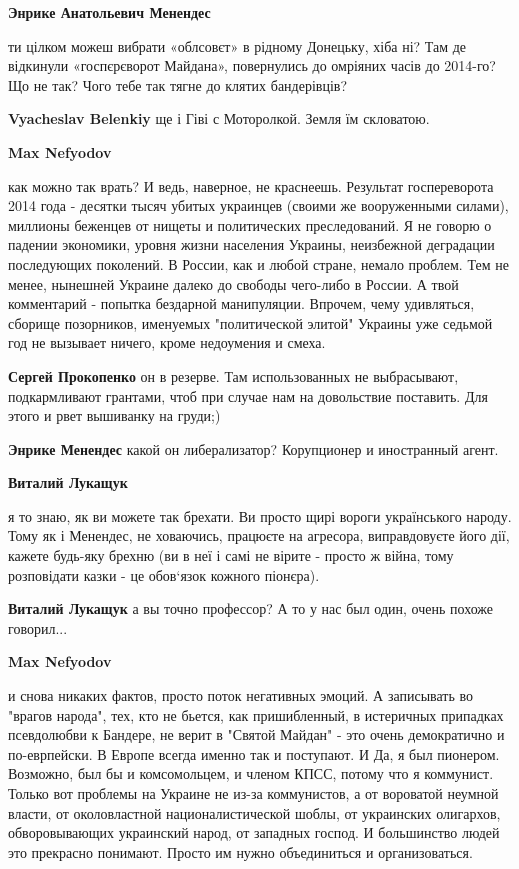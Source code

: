 \begin{itemize}
\begin{itemize}
\textbf{Энрике Анатольевич Менендес} 

ти цілком можеш вибрати «облсовєт» в рідному Донецьку, хіба ні? Там де
відкинули «госпєрєворот Майдана», повернулись до омріяних часів до 2014-го? Що
не так? Чого тебе так тягне до клятих бандерівців?

\textbf{Vyacheslav Belenkiy} ще і Гіві с Моторолкой. Земля їм скловатою.

\textbf{Max Nefyodov} 

как можно так врать? И ведь, наверное, не краснеешь. Результат госпереворота
2014 года - десятки тысяч убитых украинцев (своими же вооруженными силами),
миллионы беженцев от нищеты и политических преследований. Я не говорю о падении
экономики, уровня жизни населения Украины, неизбежной деградации последующих
поколений. В России, как и любой стране, немало проблем. Тем не менее, нынешней
Украине далеко до свободы чего-либо в России. А твой комментарий - попытка
бездарной манипуляции. Впрочем, чему удивляться, сборище позорников, именуемых
"политической элитой" Украины уже седьмой год не вызывает ничего, кроме
недоумения и смеха.

\textbf{Сергей Прокопенко} он в резерве. Там использованных не выбрасывают, подкармливают грантами, чтоб при случае нам на довольствие поставить. Для этого и рвет вышиванку на груди;)

\textbf{Энрике Менендес} какой он либерализатор? Корупционер и иностранный агент.

\textbf{Виталий Лукащук} 

я то знаю, як ви можете так брехати. Ви просто щирі вороги українського народу.
Тому як і Менендес, не ховаючись, працюєте на агресора, виправдовуєте його дії,
кажете будь-яку брехню (ви в неї і самі не вірите - просто ж війна, тому
розповідати казки - це обов‘язок кожного піонєра).

\textbf{Виталий Лукащук} а вы точно профессор? А то у нас был один, очень похоже говорил...

\textbf{Max Nefyodov} 

и снова никаких фактов, просто поток негативных эмоций. А записывать во "врагов
народа", тех, кто не бьется, как пришибленный, в истеричных припадках
псевдолюбви к Бандере, не верит в "Святой Майдан" - это очень демократично и
по-еврпейски. В Европе всегда именно так и поступают. И Да, я был пионером.
Возможно, был бы и комсомольцем, и членом КПСС, потому что я коммунист. Только
вот проблемы на Украине не из-за коммунистов, а от вороватой неумной власти, от
околовластной националистической шоблы, от украинских олигархов, обворовывающих
украинский народ, от западных господ. И большинство людей это прекрасно
понимают. Просто им нужно объединиться и организоваться.


\end{itemize}
\end{itemize}
